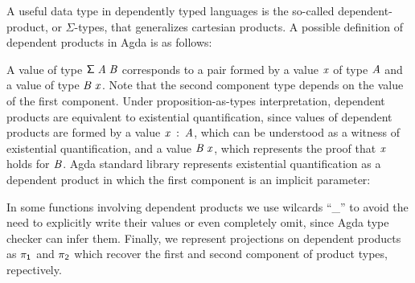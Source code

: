 \documentclass[sigconf]{acmart}
\makeatletter
\newcommand{\anonymous}{\kern0.06em \vbox{\hrule\@width.5em}}
\def\resethooks{%
  \global\let\SaveRestoreHook\empty
  \global\let\ColumnHook\empty}
\newcommand{\hsindent}[1]{\quad}%
\let\hspre\empty
\let\hspost\empty
\theoremstyle{definition}
\newcommand{\D}[1]{\blue{\mathsf{#1}}}
\newcommand{\C}[1]{\red{\mathsf{#1}}}
\newcommand{\F}[1]{\green{\mathsf{#1}}}
\newcommand{\V}[1]{\purple{\mathit{#1}}}
\makeatother
\begin{document}
A useful data type in dependently typed languages is the so-called dependent-product,
or $\Sigma$-types, that generalizes cartesian products. A possible definition of dependent products 
in Agda is as follows:
\resethooks
A value of type \ensuremath{\D{\Sigma}\;\V{A}\;\V{B}} corresponds to a pair formed by a value \ensuremath{\V{x}} of type \ensuremath{\V{A}} and 
a value of type \ensuremath{\V{B}\;\V{x}}. Note that the second component type depends on the value of the first 
component. Under proposition-as-types interpretation, dependent products are equivalent
to existential quantification, since values of dependent products are formed by a value \ensuremath{\V{x}\;\mathbin{:}\;\V{A}},
which can be understood as a witness of existential quantification, and a value \ensuremath{\V{B}\;\V{x}}, which
represents the proof that \ensuremath{\V{x}} holds for \ensuremath{\V{B}}. Agda standard library represents existential
quantification as a dependent product in which the first component is an implicit parameter:
\resethooks
In some functions involving dependent products we use wilcards ``\_'' to avoid the need to
explicitly write their values or even completely omit, since Agda type checker can infer them. 
Finally, we represent projections on dependent products as \ensuremath{\F{\pi_1}} and \ensuremath{\F{\pi_2}} which recover the first
and second component of product types, repectively.
\end{document}
